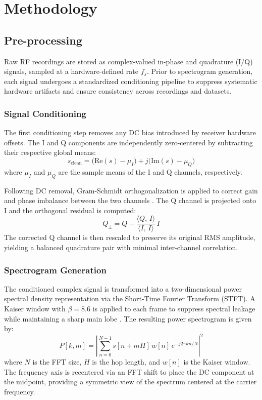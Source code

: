 \documentclass[runningheads]{llncs}
\begin{document}
\section{Methodology}
\subsection{Pre-processing}

Raw RF recordings are stored as complex-valued in-phase and quadrature (I/Q) signals, sampled at a hardware-defined rate $f_s$. Prior to spectrogram generation, each signal undergoes a standardized conditioning pipeline to suppress systematic hardware artifacts and ensure consistency across recordings and datasets.

\subsubsection{Signal Conditioning}
The first conditioning step removes any DC bias introduced by receiver hardware offsets. The I and Q components are independently zero-centered by subtracting their respective global means:
\begin{equation}
    s_{\text{clean}} = \bigl(\text{Re}(s) - \mu_I\bigr) + j\bigl(\text{Im}(s) - \mu_Q\bigr)
\end{equation}
where $\mu_I$ and $\mu_Q$ are the sample means of the I and Q channels, respectively.

Following DC removal, Gram-Schmidt orthogonalization is applied to correct gain and phase imbalance between the two channels \cite{ref34}. The Q channel is projected onto I and the orthogonal residual is computed:
\begin{equation}
    Q_{\perp} = Q - \frac{\langle Q,\, I \rangle}{\langle I,\, I \rangle}\, I
\end{equation}
The corrected Q channel is then rescaled to preserve its original RMS amplitude, yielding a balanced quadrature pair with minimal inter-channel correlation.

\subsubsection{Spectrogram Generation}
The conditioned complex signal is transformed into a two-dimensional power spectral density representation via the Short-Time Fourier Transform (STFT). A Kaiser window with $\beta = 8.6$ is applied to each frame to suppress spectral leakage while maintaining a sharp main lobe \cite{ref35}. The resulting power spectrogram is given by:
\begin{equation}
    P[k, m] = \left|\sum_{n=0}^{N-1} s[n + mH]\, w[n]\, e^{-j2\pi kn/N}\right|^2
\end{equation}
where $N$ is the FFT size, $H$ is the hop length, and $w[n]$ is the Kaiser window. The frequency axis is recentered via an FFT shift to place the DC component at the midpoint, providing a symmetric view of the spectrum centered at the carrier frequency.
\end{document}

